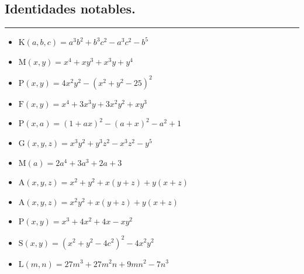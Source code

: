 \documentclass[12pt, a5paper]{article}
\begin{document}
\subsection*{Identidades notables.}
\hrule
\vspace{6pt}
\begin{itemize}
\item{$\mathrm{K}(a,b,c) = a^{3}b^{2} + b^{3}c^{2}  - a^{3}c^{2} - b^{5}$}
\item{$\mathrm{M}(x,y) = x^{4} + xy^{3} + x^{3}y + y^{4}$}
\item{$\mathrm{P}(x,y) = 4x^{2}y^{2} - (x^{2}+ y^{2} - 25)^{2}$}
\item{$\mathrm{F}(x,y) = x^{4} + 3x^{3}y + 3x^{2}y^{2} + xy^{3}$}
\item{$\mathrm{P}(x,a) = (1 + ax)^{2} - (a + x)^{2} - a^{2} + 1$}
\item{$\mathrm{G}(x,y,z) = x^{3}y^{2} + y^{3}z^{2} - x^{3}z^{2} - y^{5}$}
\item{$\mathrm{M}(a) = 2a^{4} + 3a^{3} + 2a + 3$}
\item{$\mathrm{A}(x,y,z) = x^{2} + y^{2} + x(y + z) + y (x + z)$}
\item{$\mathrm{A}(x,y,z) = x^{2}y^{2} + x(y + z) + y (x + z)$}
\item{$\mathrm{P}(x,y) = x^{3} + 4x^{2} + 4x - xy^{2}$}
\item{$\mathrm{S}(x,y) = (x^{2} + y^{2} - 4c^{2})^{2} - 4x^{2}y^{2}$}
\item{$\mathrm{L}(m,n) = 27m^{3} + 27m^{2}n + 9mn^{2} - 7n^{3}$}
\end{itemize}
\end{document}

